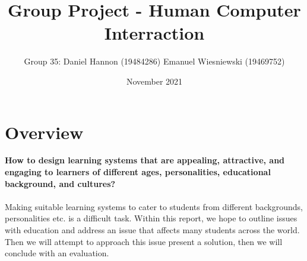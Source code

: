 \documentclass{article}
\title{Group Project - Human Computer Interraction}
\author{Group 35: Daniel Hannon (19484286) Emanuel Wiesniewski (19469752)}
\date{November 2021}
\begin{document}
	\maketitle
	\section{Overview}
	\textbf{How to design learning systems that are appealing, attractive, and engaging to learners of different ages, personalities, educational background, and cultures? }\\
	\\
	Making suitable learning systems to cater to students from different backgrounds, personalities etc. is a difficult task. Within this report, we hope to outline issues with education and address an issue that affects many students across the world. Then we will attempt to approach this issue present a solution, then we will conclude with an evaluation.
\end{document}
